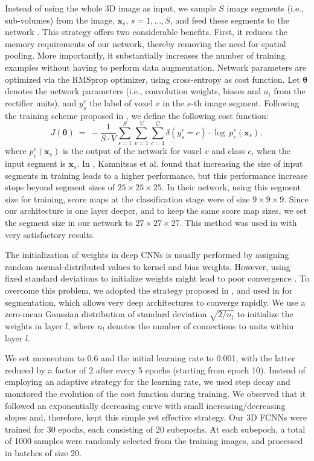 \documentclass[twoside,espcrc2]{elsarticle}
\newcommand{\vold}[1]{$#1\!\times\!#1\!\times\!#1$}
\renewcommand{\vec}[1]{\mathbf{#1}}
\newcommand{\xx}{\vec x}
\newcommand{\vt}{\boldsymbol{\theta}}
\begin{document}
Instead of using the whole 3D image as input, we sample $S$ image segments (i.e., sub-volumes) from the image, $\xx_s$, $s=1, \ldots, S$, and feed these segments to the network \cite{kamnitsas2017efficient}. This strategy offers two considerable benefits. First, it reduces the memory requirements of our network, thereby removing the need for spatial pooling. More importantly, it substantially increases the number of training examples without having to perform data augmentation. Network parameters are optimized via the RMSprop optimizer, using cross-entropy as cost function. Let $\vt$ denotes the network parameters (i.e., convolution weights, biases and $a_i$ from the rectifier units), and $y^v_s$ the label of voxel $v$ in the $s$-th image segment. Following the training scheme proposed in \cite{kamnitsas2017efficient}, we define the following cost function:
\begin{equation}
    J(\vt) \ = \ 
    -\frac{1}{S\!\cdot\!V} \sum^{S}_{s=1} \sum^{V}_{v=1} \sum^{C}_{c=1} \delta(y^v_s = c) \cdot \log \, p^v_c(\xx_s),
\end{equation}
where $p^v_c(\xx_s)$ is the output of the network for voxel $v$ and class $c$, when the input segment is $\xx_s$. 
In \cite{kamnitsas2017efficient}, Kamnitsas et al. found that increasing the size of input segments in training leads to a higher 
performance, but this performance increase stops beyond segment sizes of \vold{25}. In their network, using this segment size for training, score
maps at the classification stage were of size \vold{9}. Since our architecture is one layer deeper, and to keep the same score map sizes, we set 
the segment size in our network to \vold{27}. This method was used in \cite{DolzNeuro2017} with very satisfactory results.

The initialization of weights in deep CNNs is usually performed by assigning random normal-distributed values to kernel and bias weights. However, using fixed standard deviations to initialize weights might lead to poor convergence \cite{simonyan2014very}. To overcome this problem, we adopted the strategy proposed in \cite{he2015delving}, and used in \cite{DolzNeuro2017,kamnitsas2017efficient} for segmentation, which allows very deep architectures to converge rapidly. We use a zero-mean Gaussian distribution of standard deviation $\sqrt{2/n_l}$ to initialize the weights in layer $l$, where $n_l$ denotes the number of connections to units within layer $l$. 
 
We set momentum to 0.6 and the initial learning rate to 0.001, with the latter reduced by a factor of 2 after every 5 epochs (starting from epoch 10). 
Instead of employing an adaptive strategy for the learning rate, we used step decay and monitored the evolution of the cost function during training. 
We observed that it followed an exponentially decreasing curve with small increasing/decreasing slopes and, therefore, kept this simple yet effective strategy. 
Our 3D FCNNs were trained for 30 epochs, each consisting of 20 subepochs. At each subepoch, a total of 1000 samples were randomly selected from the training images, and processed in batches of size 20.
\end{document}
